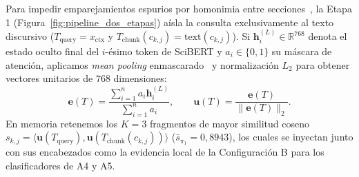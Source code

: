 \documentclass[conference]{IEEEtran}
\begin{document}
Para impedir emparejamientos espurios por homonimia entre secciones~\cite{paolini2025citefusion}, la Etapa 1 (Figura~\ref{fig:pipeline_dos_etapas}) aísla la consulta exclusivamente al texto discursivo ($T_{\text{query}} = x_{\text{ctx}}$ y $T_{\text{chunk}}(c_{k,j}) = \text{text}(c_{k,j})$). Si $\mathbf{h}_i^{(L)} \in \mathbb{R}^{768}$ denota el estado oculto final del $i$-ésimo token de SciBERT y $a_i \in \{0, 1\}$ su máscara de atención, aplicamos \textit{mean pooling} enmascarado~\cite{reimers2019sentence} y normalización $L_2$ para obtener vectores unitarios de $768$ dimensiones:
\begin{equation}
\label{eq:mean_pooling_l2}
\mathbf{e}(T) = \frac{\sum_{i=1}^{n} a_i \mathbf{h}_i^{(L)}}{\sum_{i=1}^{n} a_i},\qquad \mathbf{u}(T) = \frac{\mathbf{e}(T)}{\|\mathbf{e}(T)\|_2}.
\end{equation}
En memoria retenemos los $K=3$ fragmentos de mayor similitud coseno $s_{k,j} = \langle \mathbf{u}(T_{\text{query}}), \mathbf{u}(T_{\text{chunk}}(c_{k,j})) \rangle$ ($\bar{s}_{\pi_1} = 0,8943$), los cuales se inyectan junto con sus encabezados como la evidencia local de la Configuración B para los clasificadores de A4 y A5.
\end{document}
